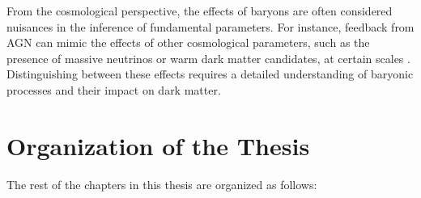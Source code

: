 From the cosmological perspective, the effects of baryons are often considered nuisances in the inference of fundamental parameters. For instance, feedback from AGN can mimic the effects of other cosmological parameters, such as the presence of massive neutrinos or warm dark matter candidates, at certain scales \citep{2019Chisari_etal_Baryfeedback,2020AricoAnguloetal_baryonifi}. Distinguishing between these effects requires a detailed understanding of baryonic processes and their impact on dark matter.

















\section{Organization of the Thesis}
The rest of the chapters in this thesis are organized as follows:

